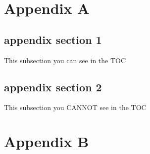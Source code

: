 \section*{Appendix A}
\label{sec: Appendix A}

\subsection*{appendix section 1}

This subsection you can see in the TOC

\subsection*{appendix section 2}
This subsection you CANNOT see in the TOC

\section*{Appendix B}
\label{sec: Appendix B}

